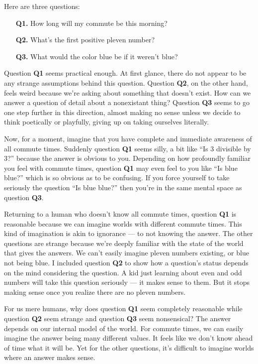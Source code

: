 \documentclass[11pt, oneside]{article}   	%
\begin{document}
Here are three questions:
\begin{enumerate}
    \item[{\bf Q1.}] How long will my commute be this morning?
    \item[{\bf Q2.}] What's the first positive pleven number?
    \item[{\bf Q3.}] What would the color blue be if it weren't blue?
\end{enumerate}
Question {\bf Q1} seems practical enough. At first glance, there do not appear
to be any strange assumptions behind this question.
Question {\bf Q2}, on the other hand, feels weird because we're asking about
something that doesn't exist. How can we answer a question of detail about a
nonexistant thing? Question {\bf Q3} seems to go one step further in this
direction, almost making no sense unless we decide to think poetically or
playfully, giving up on taking ourselves literally.

Now, for a moment, imagine that you have complete and immediate awareness of all
commute times. Suddenly question {\bf Q1} seems silly, a bit like ``Is 3
divisible by 3?'' because the answer is obvious to you.
Depending on how profoundly
familiar you feel with commute times, question {\bf Q1} may even feel to you
like ``Is blue blue?'' which is so obvious as to be confusing. If you force
yourself to take seriously the question ``Is blue blue?'' then you're in the
same mental space as question {\bf Q3}.

Returning to a human who doesn't know all commute times,
question {\bf Q1} is
reasonable because we can imagine worlds with different commute
times. This kind of imagination is akin to ignorance --- to not knowing the
answer.
The other questions are strange because we're deeply familiar with the state of
the world that gives the answers. We can't easily imagine pleven numbers
existing, or blue not being blue.
I included question {\bf Q2} to show how a question's status depends on the mind
considering the question. A kid just learning about even and odd numbers will
take this question seriously --- it makes sense to them. But it stops making
sense once you realize there are no pleven numbers.

\iffalse
For us mere humans, why does question {\bf Q1} seem completely reasonable while
question {\bf Q2} seem strange and question {\bf Q3} seem nonsensical?
The answer depends on our internal model of the world. For commute times, we can
easily imagine the answer being many different values. It feels like we don't
know ahead of time what it will be.
Yet for the other questions, it's difficult to imagine worlds where an answer
makes sense.
\end{document}
